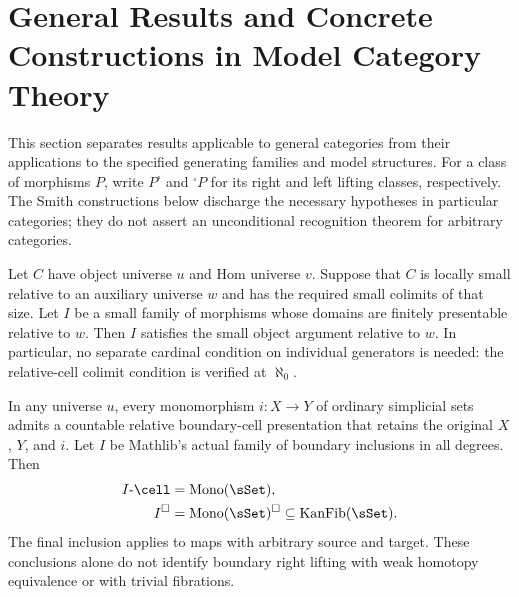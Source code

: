\section{General Results and Concrete Constructions in Model Category Theory}

This section separates results applicable to general categories from their applications to the specified generating families and model structures.
For a class of morphisms $P$, write $P^{\square}$ and ${}^{\square}P$ for its right and left lifting classes, respectively.
The Smith constructions below discharge the necessary hypotheses in particular categories; they do not assert an unconditional recognition theorem for arbitrary categories.

\begin{resultblock}
\begin{theorem}
Let $C$ have object universe $u$ and Hom universe $v$.
Suppose that $C$ is locally small relative to an auxiliary universe $w$ and has the required small colimits of that size.
Let $I$ be a small family of morphisms whose domains are finitely presentable relative to $w$.
Then $I$ satisfies the small object argument relative to $w$.
In particular, no separate cardinal condition on individual generators is needed: the relative-cell colimit condition is verified at $\aleph_0$.
\end{theorem}
\end{resultblock}

\begin{resultblock}
\begin{theorem}
In any universe $u$, every monomorphism $i:X\to Y$ of ordinary simplicial sets admits a countable relative boundary-cell presentation that retains the original $X$, $Y$, and $i$.
Let $I$ be Mathlib's actual family of boundary inclusions in all degrees.
Then
\begin{align}
I\text{-}\cell
  &= \operatorname{Mono}(\sSet), \\
I^{\square} &= \operatorname{Mono}(\sSet)^{\square}
  \subseteq \operatorname{KanFib}(\sSet).
\end{align}
The final inclusion applies to maps with arbitrary source and target.
These conclusions alone do not identify boundary right lifting with weak homotopy equivalence or with trivial fibrations.
\end{theorem}
\end{resultblock}

